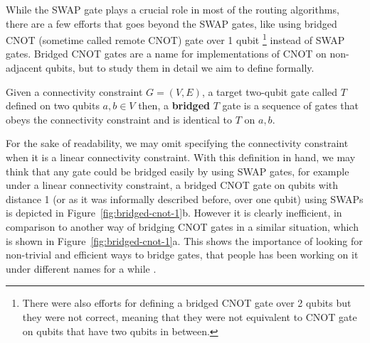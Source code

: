 While the SWAP gate plays a crucial role in most of the routing algorithms, there are a few efforts that goes beyond the SWAP gates, like using bridged CNOT (sometime called remote CNOT) gate over 1 qubit \cite{itoko2019,zhou2020,nishio2020,siraichi2018,sivarajah2021} \footnote{
  There were also efforts for defining a bridged CNOT gate over 2 qubits \cite{zhou2020,nishio2020} but they were not correct, meaning that they were not equivalent to CNOT gate on qubits that have two qubits in between.
} instead of SWAP gates. Bridged CNOT gates are a name for implementations of CNOT on non-adjacent qubits, but to study them in detail we aim to define formally.

\begin{definition}
  Given a connectivity constraint $G = (V, E)$, a target two-qubit gate called $T$ defined on two qubits $a, b \in V$ then, a \textbf{bridged} $T$ gate is a sequence of gates that obeys the connectivity constraint and is identical to $T$ on $a, b$.
\end{definition}

For the sake of readability, we may omit specifying the connectivity constraint when it is a linear connectivity constraint. With this definition in hand, we may think that any gate could be bridged easily by using SWAP gates, for example under a linear connectivity constraint, a bridged CNOT gate on qubits with distance 1 (or as it was informally described before, over one qubit) using SWAPs is depicted in Figure~\ref{fig:bridged-cnot-1}b. However it is clearly inefficient, in comparison to another way of bridging CNOT gates in a similar situation, which is shown in Figure~\ref{fig:bridged-cnot-1}a. This shows the importance of looking for non-trivial and efficient ways to bridge gates, that people has been working on it under different names for a while \cite{shende2006}.

